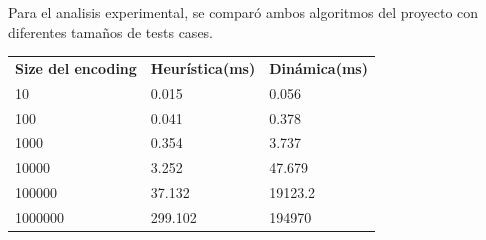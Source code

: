 Para el analisis experimental, se comparó ambos algoritmos del proyecto con diferentes tamaños de 
tests cases.

\begin{table}[H]
    \begin{tabular}{lll}
    \textbf{Size del encoding} & \textbf{Heurística(ms)} & \textbf{Dinámica(ms)} \\
    10                         & 0.015                   & 0.056                 \\
    100                        & 0.041                   & 0.378                 \\
    1000                       & 0.354                   & 3.737                 \\
    10000                      & 3.252                   & 47.679                \\
    100000                     & 37.132                  & 19123.2               \\
    1000000                    & 299.102                 & 194970               
\end{tabular}
\end{table}
